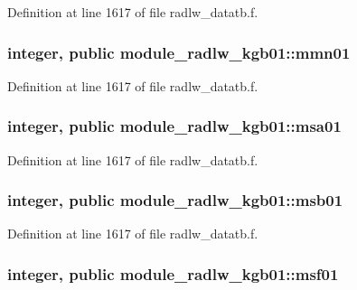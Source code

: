 Definition at line 1617 of file radlw\+\_\+datatb.\+f.

\subsubsection[{\texorpdfstring{mmn01}{mmn01}}]{\setlength{\rightskip}{0pt plus 5cm}integer, public module\+\_\+radlw\+\_\+kgb01\+::mmn01}\hypertarget{namespacemodule__radlw__kgb01_a218c6844f9043f362571f091a4f80522}{}\label{namespacemodule__radlw__kgb01_a218c6844f9043f362571f091a4f80522}


Definition at line 1617 of file radlw\+\_\+datatb.\+f.

\subsubsection[{\texorpdfstring{msa01}{msa01}}]{\setlength{\rightskip}{0pt plus 5cm}integer, public module\+\_\+radlw\+\_\+kgb01\+::msa01}\hypertarget{namespacemodule__radlw__kgb01_a60db2a67b7f03a52fa88acd2c7874dfc}{}\label{namespacemodule__radlw__kgb01_a60db2a67b7f03a52fa88acd2c7874dfc}


Definition at line 1617 of file radlw\+\_\+datatb.\+f.

\subsubsection[{\texorpdfstring{msb01}{msb01}}]{\setlength{\rightskip}{0pt plus 5cm}integer, public module\+\_\+radlw\+\_\+kgb01\+::msb01}\hypertarget{namespacemodule__radlw__kgb01_ae34d953adc793ad27a294864e3e0e354}{}\label{namespacemodule__radlw__kgb01_ae34d953adc793ad27a294864e3e0e354}


Definition at line 1617 of file radlw\+\_\+datatb.\+f.

\subsubsection[{\texorpdfstring{msf01}{msf01}}]{\setlength{\rightskip}{0pt plus 5cm}integer, public module\+\_\+radlw\+\_\+kgb01\+::msf01}\hypertarget{namespacemodule__radlw__kgb01_a321c2e84e14d28142d08bb5fbe485a67}{}\label{namespacemodule__radlw__kgb01_a321c2e84e14d28142d08bb5fbe485a67}


